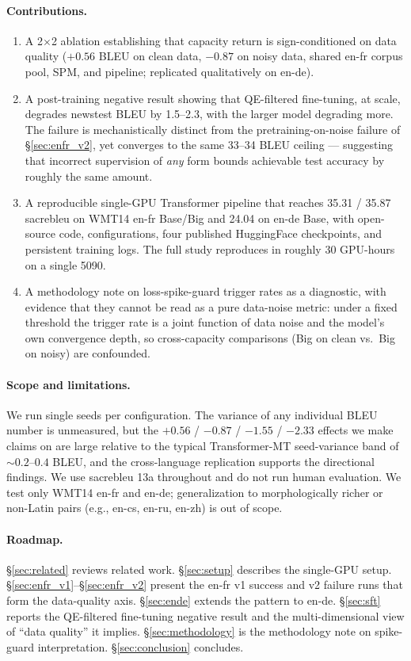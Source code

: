 \paragraph{Contributions.}
\begin{enumerate}
\item A 2$\times$2 ablation establishing that capacity return is sign-conditioned on data quality ($+0.56$ BLEU on clean data, $-0.87$ on noisy data, shared en-fr corpus pool, SPM, and pipeline; replicated qualitatively on en-de).
\item A post-training negative result showing that QE-filtered fine-tuning, at scale, degrades newstest BLEU by 1.5--2.3, with the larger model degrading more. The failure is mechanistically distinct from the pretraining-on-noise failure of \S\ref{sec:enfr_v2}, yet converges to the same 33--34 BLEU ceiling --- suggesting that incorrect supervision of \emph{any} form bounds achievable test accuracy by roughly the same amount.
\item A reproducible single-GPU Transformer pipeline that reaches 35.31 / 35.87 sacrebleu on WMT14 en-fr Base/Big and 24.04 on en-de Base, with open-source code, configurations, four published HuggingFace checkpoints, and persistent training logs. The full study reproduces in roughly 30 GPU-hours on a single 5090.
\item A methodology note on loss-spike-guard trigger rates as a diagnostic, with evidence that they cannot be read as a pure data-noise metric: under a fixed threshold the trigger rate is a joint function of data noise and the model's own convergence depth, so cross-capacity comparisons (Big on clean vs.\ Big on noisy) are confounded.
\end{enumerate}

\paragraph{Scope and limitations.}
We run single seeds per configuration. The variance of any individual BLEU number is unmeasured, but the $+0.56$ / $-0.87$ / $-1.55$ / $-2.33$ effects we make claims on are large relative to the typical Transformer-MT seed-variance band of ${\sim}0.2$--$0.4$ BLEU, and the cross-language replication supports the directional findings. We use sacrebleu 13a throughout and do not run human evaluation. We test only WMT14 en-fr and en-de; generalization to morphologically richer or non-Latin pairs (e.g., en-cs, en-ru, en-zh) is out of scope.

\paragraph{Roadmap.}
\S\ref{sec:related} reviews related work. \S\ref{sec:setup} describes the single-GPU setup. \S\ref{sec:enfr_v1}--\S\ref{sec:enfr_v2} present the en-fr v1 success and v2 failure runs that form the data-quality axis. \S\ref{sec:ende} extends the pattern to en-de. \S\ref{sec:sft} reports the QE-filtered fine-tuning negative result and the multi-dimensional view of ``data quality'' it implies. \S\ref{sec:methodology} is the methodology note on spike-guard interpretation. \S\ref{sec:conclusion} concludes.
